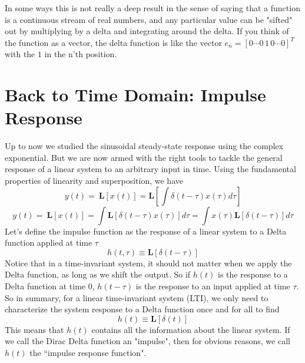 In some ways this is not really a deep result in the sense of  saying that a function is a continuous stream of real numbers, and any particular value can be "sifted" out by multiplying by a delta and integrating around the delta.  If you think of the function as a vector, the delta function is like the vector $e_n = [0 \cdots 0\, 1\, 0 \cdots 0 ]^T$ with the $1$ in the n'th position. 
\section{Back to Time Domain:  Impulse Response}
Up to now we studied the sinusoidal steady-state response using the complex exponential.  But we are now armed with the right tools to tackle the general response of a linear system to an arbitrary input in time.  Using the fundamental properties of linearity and superposition, we have
    \begin{equation}
        y\left(t\right)=\ \mathbf{L}\left[x\left(t\right)\right]=\mathbf{L}\left[\int\delta\left(t-\tau\right)x\left(\tau\right)d\tau\right]
    \end{equation}
    \begin{equation}
        y\left(t\right)=\ \mathbf{L}\left[x\left(t\right)\right]=\int \mathbf{L}\left[\delta\left(t-\tau\right)x\left(\tau\right)\right]d\tau= \int x\left(\tau\right)\mathbf{L}\left[\delta\left(t-\tau\right)\right]d\tau
    \end{equation}
Let's define the impulse function as the response of a linear system to a Delta function applied at time $\tau$
    \begin{equation}
        h(t,\tau) \equiv  \mathbf{L}[\delta(t-\tau)]
    \end{equation}
Notice that in a time-invariant system, it should not matter when we apply the Delta function, as long as we shift the output.  So if $h(t)$ is the response to a Delta function at time 0, $h(t-\tau)$ is the response to an input applied at time $\tau$.  So in summary, for a linear time-invariant system (LTI), we only need to characterize the system response to a Delta function once and for all to find
    \begin{equation}
        h(t) \equiv  \mathbf{L}[\delta(t)]
    \end{equation}
This means that $h(t)$ contains all the information about the linear system. If we call the Dirac Delta function an "impulse", then for obvious reasons, we call $h(t)$ the ``impulse response function". 
